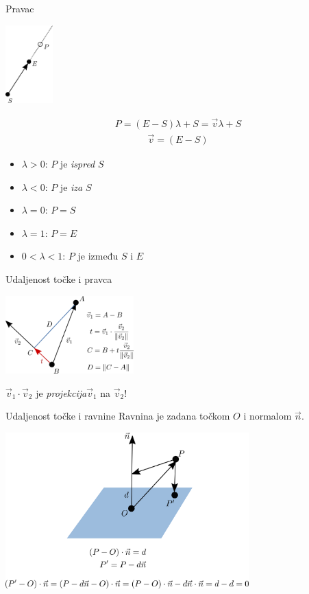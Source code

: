 \documentclass[9pt]{beamer}
\begin{document}
\begin{frame}{Pravac}
	\begin{center}
		\includegraphics[height=3cm]{./slike/linear_algebra_pravci.png}
	\end{center}
	\begin{align*}
		P = (E-S)\lambda + S = \vec{v}\lambda + S
	\end{align*}
	\begin{align*}
	\vec{v} = (E-S)
	\end{align*}
	
	\begin{itemize}
		\item $\lambda > 0$: $P$ je \textit{ispred} $S$
		\item $\lambda < 0$: $P$ je \textit{iza} $S$
		\item $\lambda = 0$: $P = S$
		\item $\lambda = 1$: $P = E$
		\item $0 < \lambda < 1$: $P$ je između $S$ i $E$
	\end{itemize}
\end{frame}

\begin{frame}{Udaljenost točke i pravca}
	\begin{center}
		\includegraphics[height=3cm]{./slike/linear_algebra_line_point_distance.png}
	\end{center}
	$\vec{v}_1\cdot \vec{v}_2$ je \textit{projekcija}$\vec{v}_1$ na $\vec{v}_2$!
\end{frame}

\begin{frame}{Udaljenost točke i ravnine}
	Ravnina je zadana točkom $O$ i normalom $\vec{n}$.
	\begin{center}
		\includegraphics[height=6cm]{./slike/linear_algebra_plane_point_distance.png}
	\end{center}
\end{frame}
\end{document}
